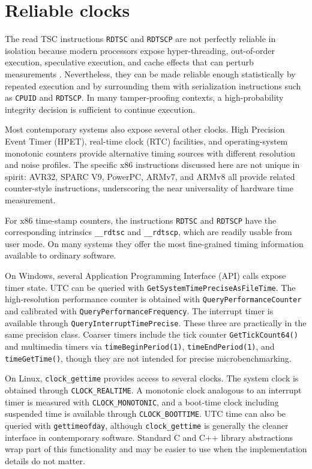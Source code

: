 \documentclass[11pt]{article}
\begin{document}
\section{Reliable clocks}\label{sec:clocks}

The read TSC instructions \texttt{RDTSC} and \texttt{RDTSCP} are not perfectly
reliable in isolation because modern processors expose hyper-threading,
out-of-order execution, speculative execution, and cache effects that can
perturb measurements \cite{6557172}.  Nevertheless, they can be made reliable
enough statistically by repeated execution and by surrounding them with
serialization instructions such as \texttt{CPUID} and \texttt{RDTSCP}.  In many
tamper-proofing contexts, a high-probability integrity decision is sufficient to
continue execution.

Most contemporary systems also expose several other clocks.  High Precision Event
Timer (HPET), real-time clock (RTC) facilities, and operating-system monotonic
counters provide alternative timing sources with different resolution and noise
profiles.  The specific x86 instructions discussed here are not unique in spirit:
AVR32, SPARC V9, PowerPC, ARMv7, and ARMv8 all provide related counter-style
instructions, underscoring the near universality of hardware time measurement.

For x86 time-stamp counters, the instructions \texttt{RDTSC} and \texttt{RDTSCP}
have the corresponding intrinsics \lstinline|__rdtsc| and \lstinline|__rdtscp|,
which are readily usable from user mode.  On many systems they offer the most
fine-grained timing information available to ordinary software.

On Windows, several Application Programming Interface (API) calls expose timer
state.  UTC can be queried with
\lstinline|GetSystemTimePreciseAsFileTime|.  The high-resolution performance
counter is obtained with \lstinline|QueryPerformanceCounter| and calibrated with
\lstinline|QueryPerformanceFrequency|.  The interrupt timer is available through
\lstinline|QueryInterruptTimePrecise|.  These three are practically in the same
precision class.  Coarser timers include the tick counter
\lstinline|GetTickCount64()| and multimedia timers via
\lstinline|timeBeginPeriod(1)|, \lstinline|timeEndPeriod(1)|, and
\lstinline|timeGetTime()|, though they are not intended for precise
microbenchmarking.

On Linux, \lstinline|clock_gettime| provides access to several clocks.  The
system clock is obtained through \lstinline|CLOCK_REALTIME|.  A monotonic clock
analogous to an interrupt timer is measured with
\lstinline|CLOCK_MONOTONIC|, and a boot-time clock including suspended time is
available through \lstinline|CLOCK_BOOTTIME|.  UTC time can also be queried with
\lstinline|gettimeofday|, although \lstinline|clock_gettime| is generally the
cleaner interface in contemporary software.  Standard C and C++ library
abstractions wrap part of this functionality and may be easier to use when the
implementation details do not matter.
\end{document}

